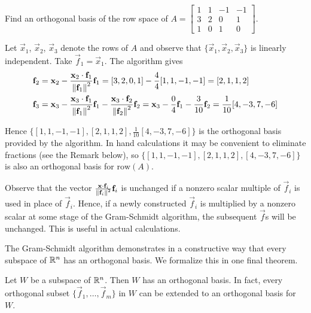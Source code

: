 \documentclass{ximera}
\begin{document}
\begin{example}\label{023743}
Find an orthogonal basis of the row space of $A = \begin{bmatrix}
1 & 1 & -1 & -1\\
3 & 2 & 0 & 1\\
1 & 0 & 1 & 0
\end{bmatrix}$.

\begin{explanation}
  Let $\vec{x}_{1}$, $\vec{x}_{2}$, $\vec{x}_{3}$ denote the rows of $A$ and observe that $\{\vec{x}_{1}, \vec{x}_{2}, \vec{x}_{3}\}$ is linearly independent. Take $\vec{f}_{1} = \vec{x}_{1}$. The algorithm gives
\begin{align*}
\mathbf{f}_{2} &= \mathbf{x}_{2} - \frac{\mathbf{x}_{2} \cdot \mathbf{f}_{1}}{\left\lVert\mathbf{f}_{1}\right\rVert^2}\mathbf{f}_{1} = [3, 2, 0, 1] - \frac{4}{4}[1, 1, -1, -1] = [2, 1, 1, 2] \\
\mathbf{f}_{3} &= \mathbf{x}_{3} - \frac{\mathbf{x}_{3} \cdot \mathbf{f}_{1}}{\left\lVert\mathbf{f}_{1}\right\rVert^2}\mathbf{f}_{1} - \frac{\mathbf{x}_{3} \cdot \mathbf{f}_{2}}{\left\lVert\mathbf{f}_{2}\right\rVert^2}\mathbf{f}_{2} = \mathbf{x}_{3} - \frac{0}{4}\mathbf{f}_{1} - \frac{3}{10}\mathbf{f}_{2} = \frac{1}{10}[4, -3, 7, -6]
\end{align*}

Hence $\{[1, 1, -1, -1], [2, 1, 1, 2], \frac{1}{10}[4, -3, 7, -6]\}$ is the orthogonal basis provided by the algorithm. In
hand calculations it may be convenient to eliminate fractions (see the Remark below), so $\{[1, 1, -1, -1], [2, 1, 1, 2], [4, -3, 7, -6]\}$ is also an orthogonal basis for $\mbox{row}(A)$.
\end{explanation}
\end{example}

\begin{remark}
Observe that the vector $\frac{\mathbf{x} \cdot \mathbf{f}_{i}}{\left\lVert\mathbf{f}_{i}\right\rVert^2}\mathbf{f}_{i}$
 is unchanged if a nonzero scalar multiple of $\vec{f}_{i}$ is used in place of $\vec{f}_{i}$. Hence, if a newly constructed $\vec{f}_{i}$ is multiplied by a nonzero scalar at some stage of the Gram-Schmidt algorithm, the subsequent $\vec{f}$s will be unchanged. This is useful in actual calculations.
 \end{remark}

The Gram-Schmidt algorithm demonstrates in a constructive way that every subspace of $\mathbb{R}^n$ has an orthogonal basis.  We formalize this in one final theorem.

\begin{theorem}\label{023635}
Let $W$ be a subspace of $\mathbb{R}^n$.  Then  $W$ has an orthogonal basis.  In fact, every orthogonal subset $\{\vec{f}_{1}, \dots , \vec{f}_{m}\}$ in $W$ can be extended to an orthogonal basis for $W$.
\end{theorem}
\end{document}
